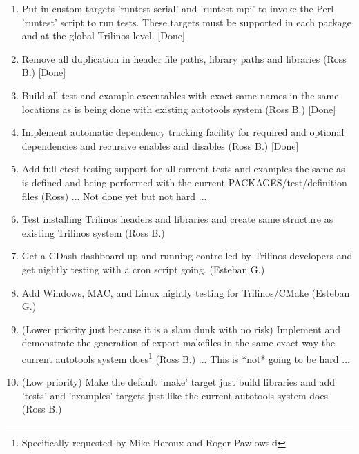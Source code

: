 \begin{enumerate}
  \begin{enumerate}

  {}\item Put in custom targets 'runtest-serial' and 'runtest-mpi' to
  invoke the Perl 'runtest' script to run tests.  These targets must
  be supported in each package and at the global Trilinos
  level. [Done]

  {}\item Remove all duplication in header file paths, library paths
  and libraries (Ross B.) [Done]

  {}\item Build all test and example executables with exact same names
  in the same locations as is being done with existing autotools
  system (Ross B.) [Done]

  {}\item Implement automatic dependency tracking facility for
  required and optional dependencies and recursive enables and
  disables (Ross B.) [Done]

  {}\item Add full ctest testing support for all current tests and
  examples the same as is defined and being performed with the current
  PACKAGES/test/definition files (Ross) ... Not done yet but not hard
  ...

  {}\item Test installing Trilinos headers and libraries and create
  same structure as existing Trilinos system (Ross B.)

  {}\item Get a CDash dashboard up and running controlled by Trilinos
  developers and get nightly testing with a cron script
  going. (Esteban G.)

  {}\item Add Windows, MAC, and Linux nightly testing for
  Trilinos/CMake (Esteban G.)

  {}\item (Lower priority just because it is a slam dunk with no risk)
  Implement and demonstrate the generation of export makefiles in the
  same exact way the current autotools system
  does\footnote{Specifically requested by Mike Heroux and Roger
  Pawlowski} (Ross B.) ... This is *not* going to be hard ...

  {}\item (Low priority) Make the default 'make' target just build
  libraries and add 'tests' and 'examples' targets just like the
  current autotools system does (Ross B.)


\end{enumerate}
\end{enumerate}
